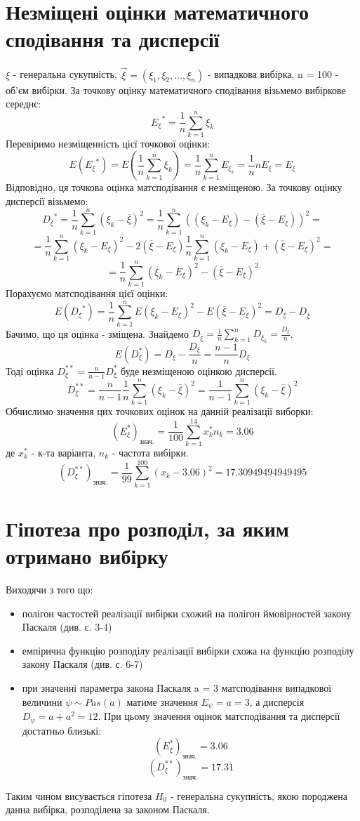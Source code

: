 \documentclass{article}
\begin{document}
\section{Незміщені оцінки математичного сподівання та дисперсії}
$\xi$ - генеральна сукупність, $\vec{\xi} = 
(\xi_1, \xi_2, \dots, \xi_{n})$ - випадкова вибірка, 
n = 100 - об’єм вибірки.  
\newline
За точкову оцінку математичного сподівання візьмемо вибіркове середнє:
$${E_\xi}^* = \frac{1}{n} \sum_{k=1}^{n}\xi_k$$
Перевіримо незміщенність цієї точкової оцінки:
$$E({E_\xi}^*) = E(\frac{1}{n} \sum_{k=1}^{n}\xi_k) = 
\frac{1}{n} \sum_{k=1}^{n}E_{\xi_k} = \frac{1}{n}nE_{\xi} 
= E_\xi$$
Відповідно, ця точкова оцінка матсподівання є незміщеною.
\newline
За точкову оцінку дисперсії візьмемо:
$$ {D_{\xi}}^{*} = \frac{1}{n} \sum_{k=1}^n 
(\xi_k - \overline{\xi})^2 = \frac{1}{n}\sum_{k=1}^n
((\xi_k - E_\xi) - (\overline{\xi} - E_\xi))^2 = $$
$$= \frac{1}{n} \sum_{k = 1}^n(\xi_k - E_\xi)^2 - 2(\overline{\xi} 
- E_\xi)\frac{1}{n}\sum_{k=1}^n(\xi_k - E_\xi) + (\overline{\xi} 
- E_\xi)^2 = $$
$$= \frac{1}{n} \sum_{k = 1}^n (\xi_k - E_\xi)^2 - (\overline{\xi} 
- E_\xi)^2$$
Порахуємо матсподівання цієї оцінки:
$$E({D_{\xi}}^{*}) = \frac{1}{n}\sum_{k=1}^n E(\xi_k - E_\xi)^2 
- E(\overline{\xi} - E_\xi)^2 = D_\xi - D_{\overline{\xi}}$$
Бачимо, що ця оцінка - зміщена.
Знайдемо $D_{\overline{\xi}} = \frac{1}{n}\sum_{k=1}^n D_{\xi_k} = 
\frac{D_{\xi}}{n}$.
$$E(D_\xi^*) = D_\xi - \frac{D_\xi}{n} = \frac{n-1}{n}D_\xi$$
Тоді оцінка $D^{**}_\xi = \frac{n}{n-1}D_\xi^*$ буде незміщеною 
оцінкою дисперсії.
$$D^{**}_\xi = \frac{n}{n-1} \frac{1}{n} \sum_{k=1}^n 
(\xi_k - \overline{\xi})^2 = \frac{1}{n - 1} \sum_{k=1}^n 
(\xi_k - \overline{\xi})^2$$
Обчислимо значення цих точкових оцінок на данній реалізації виборки:
$$(E^*_{\xi})_{\text{знач.}} = \frac{1}{100} 
\sum_{k = 1}^{14} x_k^* n_k = 3.06$$
де $x_k^*$ - к-та варіанта, $n_k$ - частота вибірки.
$$(D^{**}_\xi)_\text{знач.} = \frac{1}{99} \sum_{k = 1}^{100}
(x_k - 3.06)^2 = 17.30949494949495$$
\newpage
\section{Гіпотеза про розподіл, за яким отримано вибірку}
Виходячи з того що:
\begin{itemize}
  \item полігон частостей реалізації вибірки схожий на полігон 
  ймовірностей закону Паскаля (див. с. 3-4)
  \item емпірична функцію розподілу реалізації вибірки схожа на
  функцію розподілу закону Паскаля (див. с. 6-7)
  \item при значенні параметра закона Паскаля a = 3 матсподівання 
  випадкової величини $\psi \sim Pas(a)$
  матиме значення $E_\psi = a = 3$, а дисперсія $D_\psi = a + a^2 
  = 12$. При цьому значення оцінок матсподівання та дисперсії достатньо 
  близькі:
  $$(E^*_{\xi})_{\text{знач.}} = 3.06$$
  $$(D^{**}_\xi)_\text{знач.} = 17.31$$
\end{itemize}
Таким чином висувається гіпотеза $H_0$ - генеральна сукупність, 
якою породжена данна вибірка, розподілена за законом Паскаля.
\end{document}

